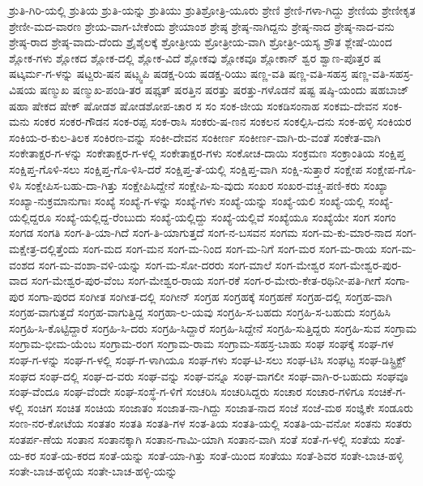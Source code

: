 ಶ್ರುತಿ-ಗಿರಿ-ಯಲ್ಲಿ
ಶ್ರುತಿಯ
ಶ್ರುತಿ-ಯನ್ನು
ಶ್ರುತಿಯು
ಶ್ರುತಿಶ್ರೋತ್ರಿ-ಯೂರು
ಶ್ರೇಣಿ
ಶ್ರೇಣಿ-ಗಳಾ-ಗಿದ್ದು
ಶ್ರೇಣಿಯ
ಶ್ರೇಣೀಕೃತ
ಶ್ರೇಣೀ-ಮದ-ವಾರಣ
ಶ್ರೇಯ-ವಾಗ-ಬೇಕೆಂದು
ಶ್ರೇಯಾಂಶ
ಶ್ರೇಷ್ಠ
ಶ್ರೇಷ್ಠ-ನಾಗಿದ್ದನು
ಶ್ರೇಷ್ಠ-ನಾದ
ಶ್ರೇಷ್ಠ-ನಾದ-ವನು
ಶ್ರೇಷ್ಠ-ರಾದ
ಶ್ರೇಷ್ಠ-ವಾದು-ದೆಂದು
ಶ್ರೈಶೈಲಕ್ಕೆ
ಶ್ರೋತ್ರೀಯ
ಶ್ರೋತ್ರೀಯ-ವಾಗಿ
ಶ್ರೋತ್ರೀ-ಯಸ್ಯ
ಶ್ರೌತ
ಶ್ಲೇಷೆ-ಯಿಂದ
ಶ್ಲೋಕ-ಗಳು
ಶ್ಲೋಕದ
ಶ್ಲೋಕ-ದಲ್ಲಿ
ಶ್ಲೋಕ-ವಿದೆ
ಶ್ಲೋಕವು
ಶ್ಲೋಕವೂ
ಶ್ಲೋಕಾನ್
ಶ್ವರ
ಶ್ವಾಣ-ಪೊತ್ತರ
ಷ
ಷಟ್ಕರ್ಮ-ಗ-ಳನ್ನು
ಷಟ್ದರು-ಷನ
ಷಟ್ಸ್ವಪಿ
ಷಡಕ್ಷ-ರಿಯ
ಷಡಕ್ಷ-ರಿಯು
ಷಣ್ಣ-ವತಿ
ಷಣ್ಣ-ವತಿ-ಸಹಸ್ರ
ಷಣ್ಣ-ವತಿ-ಸಹಸ್ರ-ವಿಷಯ
ಷಣ್ಮುಖ
ಷಣ್ಮುಖ-ಪಂಡಿ-ತರ
ಷಫ್ಕತ್
ಷರತ್ತಿನ
ಷರತ್ತು
ಷರತ್ತು-ಗಳೊಡನೆ
ಷಷ್ಟ
ಷಷ್ಠಿ-ಯಂದು
ಷಹಬಾಜ್
ಷಹಾ
ಷೇಕದ
ಷೇಕ್
ಷೋಡಶ
ಷೋಡಶೋಪ-ಚಾರ
ಸ
ಸಂ
ಸಂಕ-ಜೀಯ
ಸಂಕಡಿಸಂನಾಹ
ಸಂಕಮ-ದೇವನ
ಸಂಕ-ಮನು
ಸಂಕರ
ಸಂಕರ-ಗೌಡನ
ಸಂಕ-ರಪ್ಪ
ಸಂಕ-ರಾಸಿ
ಸಂಕರು-ಷ-ಣನ
ಸಂಕಲನ
ಸಂಕಲ್ಪಿಸಿ-ದನು
ಸಂಕ-ಹಳ್ಳಿ
ಸಂಕಿಯರ
ಸಂಕಿಯ-ರ-ಕುಲ-ತಿಲಕ
ಸಂಕಿರಣ-ವನ್ನು
ಸಂಕೀ-ದೇವನ
ಸಂಕೀರ್ಣ
ಸಂಕೀರ್ಣ-ವಾಗಿ-ರು-ವಂತೆ
ಸಂಕೇತ-ವಾಗಿ
ಸಂಕೇತಾಕ್ಷರ-ಗ-ಳನ್ನು
ಸಂಕೇತಾಕ್ಷರ-ಗ-ಳಲ್ಲಿ
ಸಂಕೇತಾಕ್ಷರ-ಗಳು
ಸಂಕೋಚ-ದಾಯಿ
ಸಂಕ್ರಮಣ
ಸಂಕ್ರಾಂತಿಯ
ಸಂಕ್ಷಿಪ್ತ
ಸಂಕ್ಷಿಪ್ತ-ಗೊಳಿ-ಸಲು
ಸಂಕ್ಷಿಪ್ತ-ಗೊ-ಳಿಸಿ-ದರೆ
ಸಂಕ್ಷಿಪ್ತ-ತೆ-ಯಲ್ಲಿ
ಸಂಕ್ಷಿಪ್ತ-ವಾಗಿ
ಸಂಕ್ಷಿ-ಸುತ್ತಾರೆ
ಸಂಕ್ಷೇಪ
ಸಂಕ್ಷೇಪ-ಗೊ-ಳಿಸಿ
ಸಂಕ್ಷೇಪಿಸ-ಬಹು-ದಾ-ಗಿತ್ತು
ಸಂಕ್ಷೇಪಿಸಿದ್ದೇನೆ
ಸಂಕ್ಷೇಪಿ-ಸು-ವುದು
ಸಂಖರ
ಸಂಖರ-ವಚ್ಚ-ಪಣಿ-ಕರು
ಸಂಖ್ಯಾ
ಸಂಖ್ಯಾ-ನುಕ್ರಮಾನುಗಾಃ
ಸಂಖ್ಯೆ
ಸಂಖ್ಯೆ-ಗ-ಳನ್ನು
ಸಂಖ್ಯೆ-ಗಳು
ಸಂಖ್ಯೆ-ಯನ್ನು
ಸಂಖ್ಯೆ-ಯಲಿ
ಸಂಖ್ಯೆ-ಯಲ್ಲಿ
ಸಂಖ್ಯೆ-ಯಲ್ಲಿದ್ದರೂ
ಸಂಖ್ಯೆ-ಯಲ್ಲಿದ್ದ-ರೆಂಬುದು
ಸಂಖ್ಯೆ-ಯಲ್ಲಿದ್ದು
ಸಂಖ್ಯೆ-ಯಲ್ಲಿವೆ
ಸಂಖ್ಯೆಯೂ
ಸಂಖ್ಯೆಯೇ
ಸಂಗ
ಸಂಗಂ
ಸಂಗಡ
ಸಂಗತಿ
ಸಂಗ-ತಿ-ಯಾ-ಗಿದೆ
ಸಂಗ-ತಿ-ಯಾಗುತ್ತದೆ
ಸಂಗ-ನ-ಬಸವನ
ಸಂಗಮ
ಸಂಗ-ಮ-ಕು-ಮಾರ-ನಾದ
ಸಂಗ-ಮಕ್ಷೇತ್ರ-ದಲ್ಲಿತ್ತೆಂದು
ಸಂಗ-ಮದ
ಸಂಗ-ಮನ
ಸಂಗ-ಮ-ನಿಂದ
ಸಂಗ-ಮ-ನಿಗೆ
ಸಂಗ-ಮರ
ಸಂಗ-ಮ-ರಾಯ
ಸಂಗ-ಮ-ವಂಶದ
ಸಂಗ-ಮ-ವಂಶಾ-ವಳಿ-ಯನ್ನು
ಸಂಗ-ಮ-ಸೋ-ದರರು
ಸಂಗ-ಮಾಲೆ
ಸಂಗ-ಮೇಶ್ವರ
ಸಂಗ-ಮೇಶ್ವರ-ಪುರ-ವಾದ
ಸಂಗ-ಮೇಶ್ವರ-ಪುರ-ವೆಂಬ
ಸಂಗ-ಮೇಶ್ವರ-ರಾಯ
ಸಂಗ-ರಕೆ
ಸಂಗ-ರ-ಮೇರು-ಕೇತ-ರಥಿನೀ-ಪತಿ-ಗೀಗೆ
ಸಂಗಾ-ಪುರ
ಸಂಗಾ-ಪುರದ
ಸಂಗೀತ
ಸಂಗೀತ-ದಲ್ಲಿ
ಸಂಗೀನ್
ಸಂಗ್ರಹ
ಸಂಗ್ರಹಕ್ಕೆ
ಸಂಗ್ರಹಣೆ
ಸಂಗ್ರಹ-ದಲ್ಲಿ
ಸಂಗ್ರಹ-ವಾಗಿ
ಸಂಗ್ರಹ-ವಾಗುತ್ತದೆ
ಸಂಗ್ರಹ-ವಾಗುತ್ತಿದ್ದ
ಸಂಗ್ರಹಾ-ಲ-ಯವು
ಸಂಗ್ರಹಿ-ಸ-ಬಹದು
ಸಂಗ್ರಹಿ-ಸ-ಬಹುದು
ಸಂಗ್ರಹಿಸಿ
ಸಂಗ್ರಹಿ-ಸಿ-ಕೊಟ್ಟಿದ್ದಾರೆ
ಸಂಗ್ರಹಿ-ಸಿ-ದರು
ಸಂಗ್ರಹಿ-ಸಿದ್ದಾರೆ
ಸಂಗ್ರಹಿ-ಸಿದ್ದೇನೆ
ಸಂಗ್ರಹಿ-ಸುತ್ತಿದ್ದರು
ಸಂಗ್ರಹಿ-ಸುವ
ಸಂಗ್ರಾಮ
ಸಂಗ್ರಾಮ-ಭೀಮ-ಯೆಂಬ
ಸಂಗ್ರಾಮ-ರಂಗ
ಸಂಗ್ರಾಮ-ರಾಮ
ಸಂಗ್ರಾಮ-ಸಹಸ್ರ-ಬಾಹು
ಸಂಘ
ಸಂಘಕ್ಕೆ
ಸಂಘ-ಗಳ
ಸಂಘ-ಗ-ಳನ್ನು
ಸಂಘ-ಗ-ಳಲ್ಲಿ
ಸಂಘ-ಗ-ಳಾಗಿಯೂ
ಸಂಘ-ಗಳು
ಸಂಘ-ಟಿ-ಸಲು
ಸಂಘ-ಟಿಸಿ
ಸಂಘಟ್ಟ
ಸಂಘ-ಡಿಸ್ಟ್ರಿಕ್ಟ್
ಸಂಘದ
ಸಂಘ-ದಲ್ಲಿ
ಸಂಘ-ದ-ವರು
ಸಂಘ-ವನ್ನು
ಸಂಘ-ವನ್ನೂ
ಸಂಘ-ವಾಗಲೀ
ಸಂಘ-ವಾಗಿ-ರ-ಬಹುದು
ಸಂಘವೂ
ಸಂಘ-ವೆಂದೂ
ಸಂಘ-ವೆಂದೇ
ಸಂಘ-ಸಂಸ್ಥೆ-ಗ-ಳಿಗೆ
ಸಂಚರಿಸಿ
ಸಂಚರಿಸಿದ್ದರು
ಸಂಚಾರ
ಸಂಚಾರ-ಗಳಿಗೂ
ಸಂಚಿಕೆ-ಗ-ಳಲ್ಲಿ
ಸಂಚಿಗ
ಸಂಚಿತ
ಸಂಚಿಯ
ಸಂಜಾತಂ
ಸಂಜಾತ-ನಾ-ಗಿದ್ದು
ಸಂಜಾತ-ನಾದ
ಸಂಜೆ
ಸಂಜೆ-ಮಠ
ಸಂಜ್ಞಿಕೇ
ಸಂಡೂರು
ಸಂಣ-ನರ-ಕೋಟೆಯ
ಸಂತತಂ
ಸಂತತಿ
ಸಂತತಿ-ಗಳ
ಸಂತ-ತಿಯ
ಸಂತತಿ-ಯಲ್ಲಿ
ಸಂತತಿ-ಯ-ವನೋ
ಸಂತನು
ಸಂತರು
ಸಂತರ್ಪ-ಣೆಯ
ಸಂತಾನ
ಸಂತಾನಕ್ಕಾಗಿ
ಸಂತಾನ-ಗಾಮಿ-ಯಾಗಿ
ಸಂತಾನ-ವಾಗಿ
ಸಂತೆ
ಸಂತೆ-ಗ-ಳಲ್ಲಿ
ಸಂತೆಯ
ಸಂತೆ-ಯ-ಕರ
ಸಂತೆ-ಯ-ಕರದ
ಸಂತೆ-ಯನ್ನು
ಸಂತೆ-ಯಾ-ಗಿತ್ತು
ಸಂತೆ-ಯಿಂದ
ಸಂತೆಯು
ಸಂತೆ-ಶಿವರ
ಸಂತೇ-ಬಾಚ-ಹಳ್ಳಿ
ಸಂತೇ-ಬಾಚ-ಹಳ್ಳಿಯ
ಸಂತೇ-ಬಾಚ-ಹಳ್ಳಿ-ಯನ್ನು
